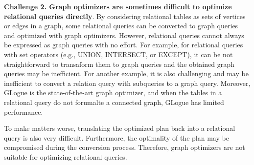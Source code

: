 \textbf{Challenge 2. Graph optimizers are sometimes difficult to optimize relational queries directly}.
By considering relational tables as sets of vertices or edges in a graph, some relational queries can be converted to graph queries and optimized with graph optimizers. 
However, relational queries cannot always be expressed as graph queries with no effort.
For example, for relational queries with set operators (e.g., UNION, INTERSECT, or EXCEPT), it can be not straightforward to transaform them to graph queries and the obtained graph queries may be inefficient.
For another example, it is also challenging and may be inefficient to convert a relation query with subqueries to a graph query.
Moreover, GLogue is the state-of-the-art graph optimizer, and when the tables in a relational query do not forumalte a connected graph, GLogue has limited performance.

To make matters worse, translating the optimized plan back into a relational query is also very difficult.
Furthermore, the optimality of the plan may be compromised during the conversion process.
Therefore, graph optimizers are not suitable for optimizing relational queries.

